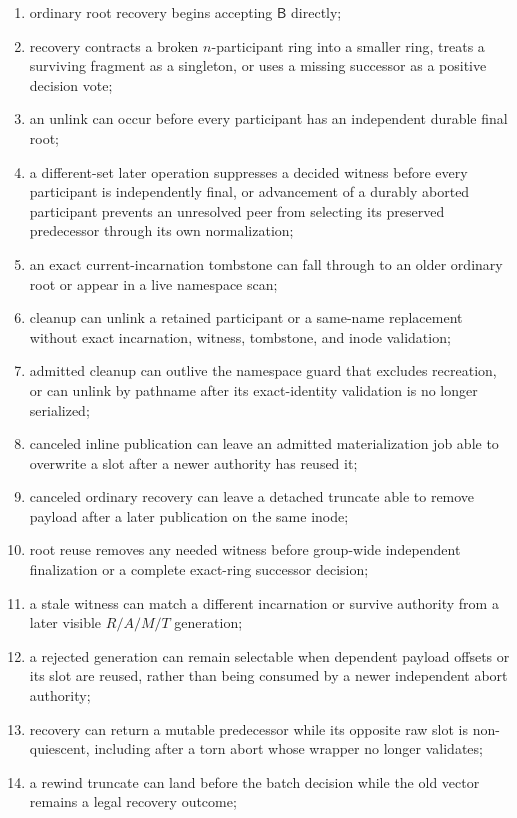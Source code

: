 \documentclass[10pt,twocolumn]{article}
\theoremstyle{remark}
\newcommand{\Prepared}{\mathsf{B}}
\begin{document}
\begin{enumerate}
  \item ordinary root recovery begins accepting $\Prepared$ directly;
  \item recovery contracts a broken $n$-participant ring into a smaller ring, treats a surviving
  fragment as a singleton, or uses a missing successor as a positive decision vote;
  \item an unlink can occur before every participant has an independent durable final root;
  \item a different-set later operation suppresses a decided witness before every participant is
  independently final, or advancement of a durably aborted participant prevents an unresolved peer
  from selecting its preserved predecessor through its own normalization;
  \item an exact current-incarnation tombstone can fall through to an older ordinary root or appear
  in a live namespace scan;
  \item cleanup can unlink a retained participant or a same-name replacement without exact
  incarnation, witness, tombstone, and inode validation;
  \item admitted cleanup can outlive the namespace guard that excludes recreation, or can unlink
  by pathname after its exact-identity validation is no longer serialized;
  \item canceled inline publication can leave an admitted materialization job able to overwrite a
  slot after a newer authority has reused it;
  \item canceled ordinary recovery can leave a detached truncate able to remove payload after a
  later publication on the same inode;
  \item root reuse removes any needed witness before group-wide independent finalization or a
  complete exact-ring successor decision;
  \item a stale witness can match a different incarnation or survive authority from a later visible
  $R/A/M/T$ generation;
  \item a rejected generation can remain selectable when dependent payload offsets or its slot are
  reused, rather than being consumed by a newer independent abort authority;
  \item recovery can return a mutable predecessor while its opposite raw slot is non-quiescent,
  including after a torn abort whose wrapper no longer validates;
  \item a rewind truncate can land before the batch decision while the old vector remains a legal
  recovery outcome;

\end{enumerate}
\end{document}
